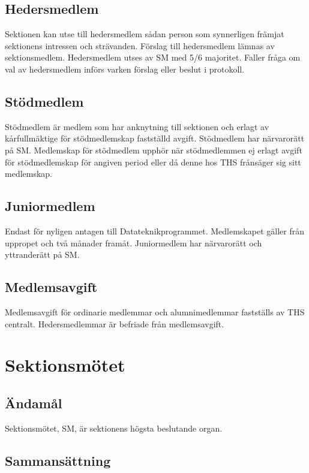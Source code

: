 \documentclass[a4paper,12pt]{article}
\begin{document}
\subsection{Hedersmedlem}
\label{sec:hedersmedlem}

Sektionen kan utse till hedersmedlem sådan person som synnerligen främjat sektionens intressen och strävanden. Förslag till hedersmedlem lämnas av sektionsmedlem. Hedersmedlem utses av SM med 5/6 majoritet. Faller fråga om val av hedersmedlem införs varken förslag eller beslut i protokoll.

\subsection{Stödmedlem}
\label{sec:stodmedlem}

Stödmedlem är medlem som har anknytning till sektionen och erlagt av kårfullmäktige för stödmedlemskap fastställd avgift. Stödmedlem har närvarorätt på SM. Medlemskap för stödmedlem upphör när stödmedlemmen ej erlagt avgift för stödmedlemskap för angiven period eller då denne hos THS frånsäger sig sitt medlemskap.

\subsection{Juniormedlem}
\label{sec:juniormedlem}

Endast för nyligen antagen till Datateknikprogrammet. Medlemskapet gäller från uppropet och två månader framåt. Juniormedlem har närvarorätt och yttranderätt på SM.

\subsection{Medlemsavgift}

Medlemsavgift för ordinarie medlemmar och alumnimedlemmar fastställs av THS centralt. Hedersmedlemmar är befriade från medlemsavgift.

\section{Sektionsmötet}

\subsection{Ändamål}

Sektionsmötet, SM, är sektionens högsta beslutande organ.

\subsection{Sammansättning}
\end{document}
